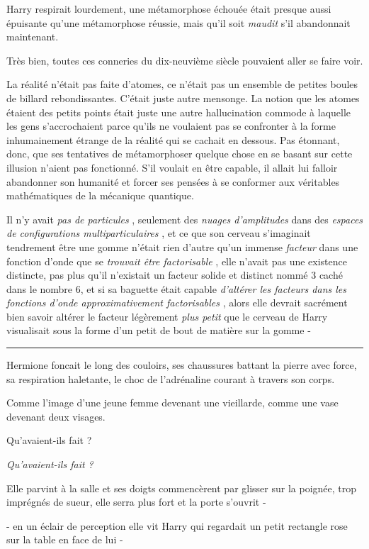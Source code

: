 Harry respirait lourdement, une métamorphose échouée était presque aussi épuisante qu'une métamorphose réussie, mais qu'il soit \emph{maudit}  s'il abandonnait maintenant.

Très bien, toutes ces conneries du dix-neuvième siècle pouvaient aller se faire voir.

La réalité n'était pas faite d'atomes, ce n'était pas un ensemble de petites boules de billard rebondissantes. C'était juste autre mensonge. La notion que les atomes étaient des petits points était juste une autre hallucination commode à laquelle les gens s'accrochaient parce qu'ils ne voulaient pas se confronter à la forme inhumainement étrange de la réalité qui se cachait en dessous. Pas étonnant, donc, que ses tentatives de métamorphoser quelque chose en se basant sur cette illusion n'aient pas fonctionné. S'il voulait en être capable, il allait lui falloir abandonner son humanité et forcer ses pensées à se conformer aux véritables mathématiques de la mécanique quantique.

Il n'y avait \emph{pas de particules} , seulement des \emph{nuages d'amplitudes } dans des \emph{espaces de configurations multiparticulaires} , et ce que son cerveau s'imaginait tendrement être une gomme n'était rien d'autre qu'un immense \emph{facteur}  dans une fonction d'onde que se \emph{trouvait être factorisable} , elle n'avait pas une existence distincte, pas plus qu'il n'existait un facteur solide et distinct nommé 3 caché dans le nombre 6, et si sa baguette était capable \emph{d'altérer les facteurs dans les fonctions d'onde approximativement factorisables} , alors elle devrait sacrément bien savoir altérer le facteur légèrement \emph{plus petit}  que le cerveau de Harry visualisait sous la forme d'un petit de bout de matière sur la gomme -
\par\noindent\rule{\textwidth}{0.4pt}
Hermione foncait le long des couloirs, ses chaussures battant la pierre avec force, sa respiration haletante, le choc de l'adrénaline courant à travers son corps.

Comme l'image d'une jeune femme devenant une vieillarde, comme une vase devenant deux visages.

Qu'avaient-ils fait ?

\emph{Qu'avaient-ils fait ?} 

Elle parvint à la salle et ses doigts commencèrent par glisser sur la poignée, trop imprégnés de sueur, elle serra plus fort et la porte s'ouvrit -

- en un éclair de perception elle vit Harry qui regardait un petit rectangle rose sur la table en face de lui -

